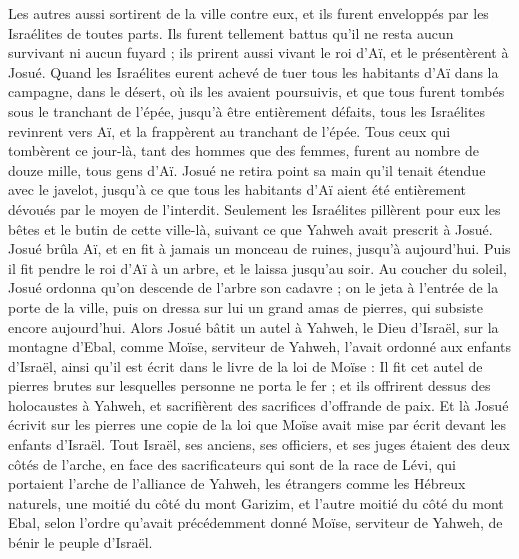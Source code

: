 \begin{multicols}{2}
Les autres aussi sortirent de la ville contre eux, et ils furent enveloppés par les Israélites de toutes parts. Ils furent tellement battus qu’il ne resta aucun survivant ni aucun fuyard ;
ils prirent aussi vivant le roi d’Aï, et le présentèrent à Josué.
Quand les Israélites eurent achevé de tuer tous les habitants d’Aï dans la campagne, dans le désert, où ils les avaient poursuivis, et que tous furent tombés sous le tranchant de l’épée, jusqu’à être entièrement défaits, tous les Israélites revinrent vers Aï, et la frappèrent au tranchant de l’épée.
Tous ceux qui tombèrent ce jour-là, tant des hommes que des femmes, furent au nombre de douze mille, tous gens d’Aï.
Josué ne retira point sa main qu’il tenait étendue avec le javelot, jusqu’à ce que tous les habitants d’Aï aient été entièrement dévoués par le moyen de l'interdit.
Seulement les Israélites pillèrent pour eux les bêtes et le butin de cette ville-là, suivant ce que Yahweh avait prescrit à Josué.
Josué brûla Aï, et en fit à jamais un monceau de ruines, jusqu’à aujourd’hui.
Puis il fit pendre le roi d’Aï à un arbre, et le laissa jusqu’au soir. Au coucher du soleil, Josué ordonna qu’on descende de l’arbre son cadavre ; on le jeta à l’entrée de la porte de la ville, puis on dressa sur lui un grand amas de pierres, qui subsiste encore aujourd’hui.
Alors Josué bâtit un autel à Yahweh, le Dieu d’Israël, sur la montagne d’Ebal,
comme Moïse, serviteur de Yahweh, l’avait ordonné aux enfants d’Israël, ainsi qu’il est écrit dans le livre de la loi de Moïse : Il fit cet autel de pierres brutes sur lesquelles personne ne porta le fer ; et ils offrirent dessus des holocaustes à Yahweh, et sacrifièrent des sacrifices d’offrande de paix.
Et là Josué écrivit sur les pierres une copie de la loi que Moïse avait mise par écrit devant les enfants d’Israël.
Tout Israël, ses anciens, ses officiers, et ses juges étaient des deux côtés de l’arche, en face des sacrificateurs qui sont de la race de Lévi, qui portaient l’arche de l’alliance de Yahweh, les étrangers comme les Hébreux naturels, une moitié du côté du mont Garizim, et l’autre moitié du côté du mont Ebal, selon l’ordre qu’avait précédemment donné Moïse, serviteur de Yahweh, de bénir le peuple d’Israël.

\end{multicols}
